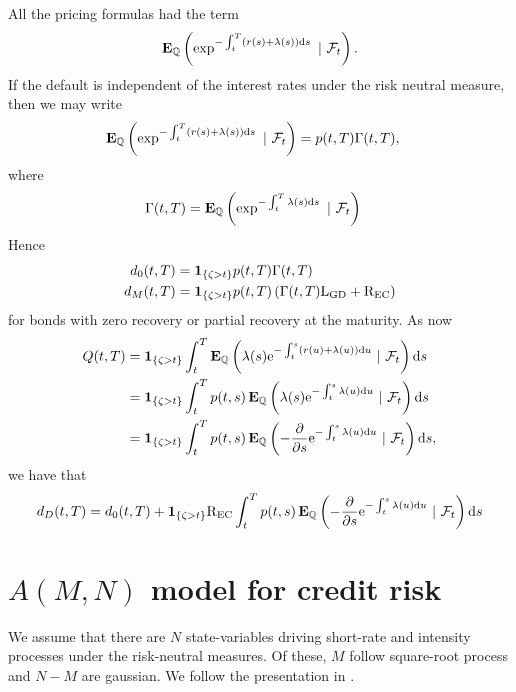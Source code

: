 All the pricing formulas had the term
	\begin{align}
		\E_{\Pm} \left( \exp^{ - \int_t^T (r(s) + \lambda(s)) \dx s } \ | \ \F_t \right) .
	\end{align}
If the default is independent of the interest rates under the risk neutral measure, then we may write
	\begin{align}
		\E_{\Pm} \left( \exp^{ - \int_t^T (r(s) + \lambda(s)) \dx s } \ | \ \F_t \right) &= \Bond(t,T) \Gamma(t,T), 
	\end{align}
where
	\begin{align}
		\Gamma(t,T) &= \operatorname{\boldsymbol{\mathrm{E}}}_{\mathbb{Q}} \left( \exp^{ - \int_t^T \lambda(s) \mathrm{d} s } \ | \ \mathcal{F}_t \right)
	\end{align}
Hence
	\begin{align}
		d_0(t,T) &= \boldsymbol{1}_{ \{\zeta > t \} } p(t,T) \Gamma(t,T) \\
		d_M(t,T) &= \boldsymbol{1}_{ \{\zeta > t \} } p(t,T) \left( \Gamma(t,T) \mathrm{L_{GD}} + \mathrm{R_{EC}} \right) 
	\end{align}
for bonds with zero recovery or partial recovery at the maturity. As now
  \begin{align}
		Q(t,T) &= \boldsymbol{1}_{ \{\zeta > t \} } \int_{t}^{T} \operatorname{\boldsymbol{\mathrm{E}}}_{\mathbb{Q}} \left( \lambda(s) \mathrm{e}^{ - \int_t^s (r(u) + \lambda(u)) \mathrm{d} u } \ | \ \mathcal{F}_t \right) \mathrm{d} s \\
		&= \boldsymbol{1}_{ \{\zeta > t \} } \int_{t}^{T} p(t,s) \operatorname{\boldsymbol{\mathrm{E}}}_{\mathbb{Q}} \left( \lambda(s) \mathrm{e}^{ - \int_t^s \lambda(u) \mathrm{d} u } \ | \ \mathcal{F}_t \right) \mathrm{d} s \\
		&= \boldsymbol{1}_{ \{\zeta > t \} } \int_{t}^{T} p(t,s) \operatorname{\boldsymbol{\mathrm{E}}}_{\mathbb{Q}} \left( - \frac{\partial}{\partial s} \mathrm{e}^{ - \int_t^s \lambda(u) \mathrm{d} u } \ | \ \mathcal{F}_t \right) \mathrm{d} s ,
	\end{align}
we have that
  \begin{align}
	d_D(t,T) = d_0 (t,T) + \boldsymbol{1}_{ \{\zeta > t \} } \mathrm{R_{EC}} \int_{t}^{T} p(t,s) \operatorname{\boldsymbol{\mathrm{E}}}_{\mathbb{Q}} \left( - \frac{\partial}{\partial s} \mathrm{e}^{ - \int_t^s \lambda(u) \mathrm{d} u } \ | \ \mathcal{F}_t \right) \mathrm{d} s
	\end{align}
	
\section{$A(M,N)$ model for credit risk}

We assume that there are $N$ state-variables driving short-rate and intensity processes under the risk-neutral measures. Of these, $M$ follow square-root process and $N-M$ are gaussian. We follow the presentation in \textcite[pp. 457--476]{nawalkabeliaevasoto2007dynamic}.

